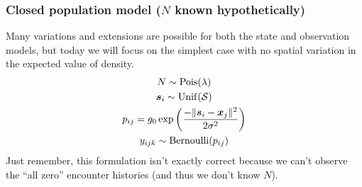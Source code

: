 \documentclass[color=usenames,dvipsnames]{beamer}\usepackage[]{graphicx}\usepackage[]{xcolor}
\begin{document}
\begin{frame}
  \frametitle{\large Closed population model ($N$ known hypothetically) }
  \footnotesize
  Many variations and extensions are possible for both the state and
  observation models, but today we will focus on the simplest case
  with no spatial variation in the expected value of density.
  \begin{gather*}
    N \sim \mathrm{Pois}(\lambda) \\
    {\bm s}_i \sim \mathrm{Unif}(\cal S) \\
    p_{ij} = g_0\exp\left(\frac{-\|{\bm s}_i - {\bm x}_j\|^2}{2\sigma^2}\right)  \\
    y_{ijk} \sim \mathrm{Bernoulli}(p_{ij})
  \end{gather*}
  \pause
  \vfill
  Just remember, this formulation isn't exactly correct because we
  can't observe the ``all zero'' encounter histories (and thus we
  don't know $N$).
\end{frame}







\end{document}
